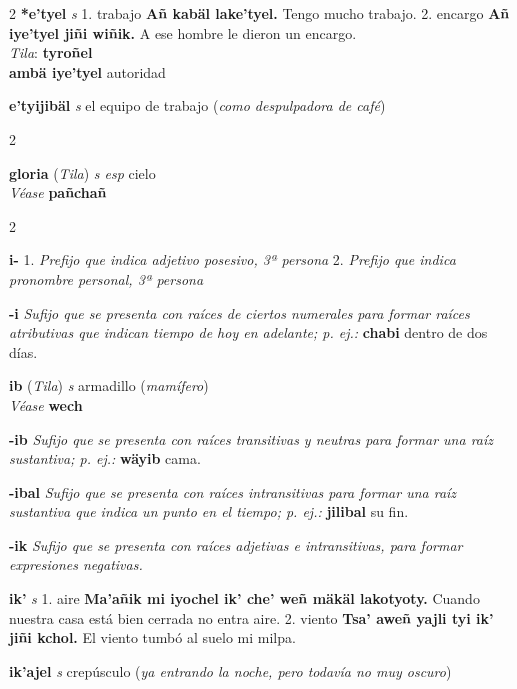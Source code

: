 \documentclass[10pt]{scrbook}
\newcommand{\entry}[1]{\textbf{#1}}
\newcommand{\alphaletter}[1]{\end{multicols}\addsec{#1}\begin{multicols}{2}}
\newcommand{\onedefinition}[1]{#1.}
\newcommand{\nontranslationdef}[1]{\textit{#1}}
\newcommand{\partofspeech}[1]{\textit{#1}}
\newcommand{\spanishtranslation}[1]{#1}
\newcommand{\clarification}[1]{(\textit{#1})}
\newcommand{\cholexample}[1]{\textbf{#1}}
\newcommand{\exampletranslation}[1]{#1}
\newcommand{\dialectvariant}[1]{\\\textit{#1}:}
\newcommand{\dialectword}[1]{\textbf{#1}}
\newcommand{\alsosee}[1]{\\\textit{Véase} \textbf{#1}}
\newcommand{\relevantdialect}[1]{(\textit{#1})}
\newcommand{\secondaryentry}[1]{\\\textbf{#1}}
\newcommand{\secondtranslation}[1]{#1}
\begin{document}
\begin{multicols}{2}
\entry{*e'tyel}
\partofspeech{s}
\onedefinition{1}
\spanishtranslation{trabajo}
\cholexample{Añ kabäl lake'tyel.}
\exampletranslation{Tengo mucho trabajo.}
\onedefinition{2}
\spanishtranslation{encargo}
\cholexample{Añ iye'tyel jiñi wiñik.}
\exampletranslation{A ese hombre le dieron un encargo.}
\dialectvariant{Tila}
\dialectword{tyroñel}
\secondaryentry{ambä iye'tyel}
\secondtranslation{autoridad}

\entry{e'tyijibäl}
\partofspeech{s}
\spanishtranslation{el equipo de trabajo}
\clarification{como despulpadora de café}

\alphaletter{G}

\entry{gloria}
\relevantdialect{Tila}
\partofspeech{s esp}
\spanishtranslation{cielo}
\alsosee{pañchañ}

\alphaletter{I}

\entry{i-}
\onedefinition{1}
\nontranslationdef{Prefijo que indica adjetivo posesivo, 3ª persona}
\onedefinition{2}
\nontranslationdef{Prefijo que indica pronombre personal, 3ª persona}

\entry{-i}
\nontranslationdef{Sufijo que se presenta con raíces de ciertos numerales para formar raíces atributivas que indican tiempo de hoy en adelante; p. ej.:}
\cholexample{chabi}
\exampletranslation{dentro de dos días.}

\entry{ib}
\relevantdialect{Tila}
\partofspeech{s}
\spanishtranslation{armadillo}
\clarification{mamífero}
\alsosee{wech}

\entry{-ib}
\nontranslationdef{Sufijo que se presenta con raíces transitivas y neutras para formar una raíz sustantiva; p. ej.:}
\cholexample{wäyib}
\exampletranslation{cama.}

\entry{-ibal}
\nontranslationdef{Sufijo que se presenta con raíces intransitivas para formar una raíz sustantiva que indica un punto en el tiempo; p. ej.:}
\cholexample{jilibal}
\exampletranslation{su fin.}

\entry{-ik}
\nontranslationdef{Sufijo que se presenta con raíces adjetivas e intransitivas, para formar expresiones negativas.}

\entry{ik'}
\partofspeech{s}
\onedefinition{1}
\spanishtranslation{aire}
\cholexample{Ma'añik mi iyochel ik' che' weñ mäkäl lakotyoty.}
\exampletranslation{Cuando nuestra casa está bien cerrada no entra aire.}
\onedefinition{2}
\spanishtranslation{viento}
\cholexample{Tsa' aweñ yajli tyi ik' jiñi kchol.}
\exampletranslation{El viento tumbó al suelo mi milpa.}

\entry{ik'ajel}
\partofspeech{s}
\spanishtranslation{crepúsculo}
\clarification{ya entrando la noche, pero todavía no muy oscuro}


\end{multicols}
\end{document}
